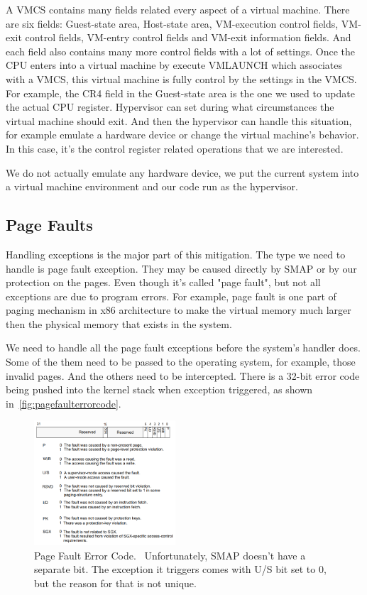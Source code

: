 A VMCS contains many fields related every aspect of a virtual machine. There are six fields: Guest-state area, Host-state area, VM-execution control fields, VM-exit control fields, VM-entry control fields and VM-exit information fields. And each field also contains many more control fields with a lot of settings. Once the CPU enters into a virtual machine by execute VMLAUNCH which associates with a VMCS, this virtual machine is fully control by the settings in the VMCS. For example, the CR4 field in the Guest-state area is the one we used to update the actual CPU register.  Hypervisor can set during what circumstances the virtual machine should exit. And then the hypervisor can handle this situation, for example emulate a hardware device or change the virtual machine's behavior. In this case, it's the control register related operations that we are interested. 

We do not actually emulate any hardware device, we put the current system into a virtual machine environment and our code run as the hypervisor.

\subsection{Page Faults}
Handling exceptions is the major part of this mitigation. The type we need to handle is page fault exception. They may be caused directly by SMAP or by our protection on the pages. Even though it's called "page fault", but not all exceptions are due to program errors. For example, page fault is one part of paging mechanism in x86 architecture to make the virtual memory much larger then the physical memory that exists in the system. 

We need to handle all the page fault exceptions before the system's handler does. Some of the them need to be passed to the operating system, for example, those invalid pages. And the others need to be intercepted. There is a 32-bit error code being pushed into the kernel stack when exception triggered, as shown in~\autoref{fig:pagefaulterrorcode}.


\begin{figure}[th]
  \includegraphics[width=0.47\textwidth]{figures/pagefaulterrorcode}
  \centering
  \caption{Page Fault Error Code.~\cite{intelinterrupt} Unfortunately, SMAP doesn't have a separate bit. The exception it triggers comes with U/S bit set to 0, but the reason for that is not unique.}
  \label{fig:pagefaulterrorcode}
\end{figure}

